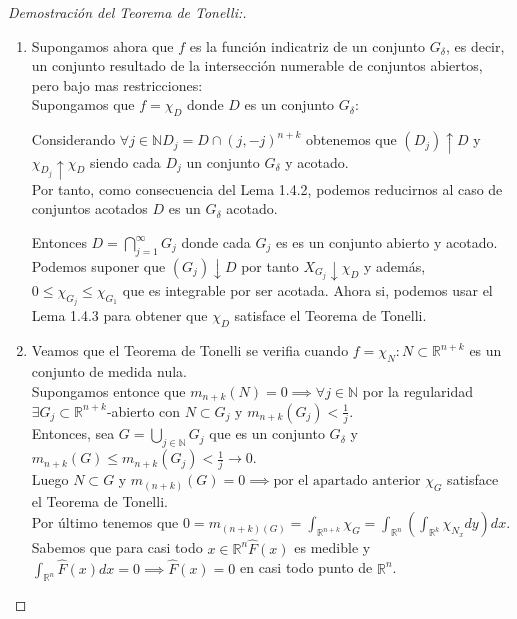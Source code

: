 \begin{proof}[Demostración del Teorema de Tonelli:]
\begin{enumerate}
$$\begin{cases}
            (G_j) \uparrow G \\
            \chi_{G_j} \uparrow \chi_G \text{ con cada } \chi_{G_j} = \sum_{i = 1}^{j}\chi_{Q_i}
        \end{cases}$$
        $\implies \forall j \in  \mathbb{N} \text{   } \chi_{G_j} = \sum_{i = 1}^{j}\chi_{Q_i}$ verifica el Teorema de Tonelli por el Lema 1.4.2 y Lema 1.4.3. Luego $\chi_G$ satisface el Teorema de Tonelli por el Lema 1.4.2.
        \item        Supongamos ahora que $f$ es la función indicatriz de un conjunto $G_{\delta}$, es decir, un conjunto resultado de la intersección numerable de conjuntos abiertos, pero bajo mas restricciones: \\
        Supongamos que $f = \chi_D$ donde $D$ es un conjunto $G_{\delta}$: 
        \begin{observación}
            Considerando $\forall j \in \mathbb{N} D_j = D \cap (j, -j)^{n+k}$ obtenemos que $(D_j)\uparrow D$ y $\chi_{D_j}\uparrow \chi_D$ siendo cada $D_j$ un conjunto $G_{\delta}$ y acotado. \\ Por tanto, como consecuencia del Lema 1.4.2, podemos reducirnos al caso de conjuntos acotados $D$ es un $G_{\delta}$ acotado.
        \end{observación}
        Entonces $D = \bigcap_{j = 1}^{\infty}G_j$ donde cada $G_j$ es es un conjunto abierto y acotado. Podemos suponer que $(G_j) \downarrow D$ por tanto $X_{G_j} \downarrow \chi_{D}$ y además, $0 \leq \chi_{G_j} \leq \chi_{G_{1}}$ que es integrable por ser acotada. Ahora si, podemos usar el Lema 1.4.3 para obtener que $\chi_{D}$ satisface el Teorema de Tonelli.
        \item Veamos que el Teorema de Tonelli se verifia cuando $f = \chi_N : N \subset \mathbb{R}^{n+k}$ es un conjunto de medida nula. \\
        Supongamos entonce que $m_{n+k}(N) = 0 \implies \forall j \in \mathbb{N}$ por la regularidad $\exists G_j \subset \mathbb{R}^{n+k}$-abierto con $N \subset G_j \text{ y } m_{n+k}(G_j) < \frac{1}{j}$. \\
        Entonces, sea $G = \bigcup_{j \in \mathbb{N}}G_j$ que es un conjunto $G_{\delta}$ y $m_{n+k}(G) \leq m_{n+k}(G_j) < \frac{1}{j} \to 0$. \\
        Luego $N \subset G$ y $m_{(n+k)}(G) = 0 \implies \text{por el apartado anterior } \chi_G$ satisface el Teorema de Tonelli. \\
        Por último tenemos que $0 = m_{(n+k)(G)} = \int_{\mathbb{R}^{n+k}}\chi_G = \int_{\mathbb{R}^n}(\int_{\mathbb{R}^k}\chi_{N_x} dy)dx$. Sabemos que para casi todo $x \in \mathbb{R}^n \widehat{F}(x)$ es medible y $\int_{\mathbb{R}^n}\widehat{F}(x)dx = 0 \implies \widehat{F}(x) = 0$ en casi todo punto de $\mathbb{R}^n$.

\end{enumerate}
\end{proof}
